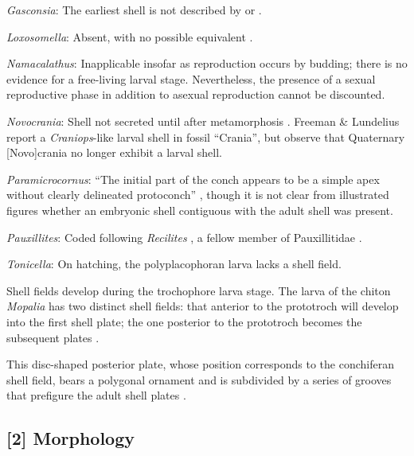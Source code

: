 \documentclass[openany]{book}
\begin{document}
\hypertarget{Gasconsia-coding-1}{}
\emph{Gasconsia}: The earliest shell is not described by
\citet{Hanken1985Thetaxonomy} or \citet{Watkins2002Newrecord}.

\hypertarget{Loxosomella-coding-1}{}
\emph{Loxosomella}: Absent, with no possible equivalent
\citep{Nielsen1966}.

\hypertarget{Namacalathus-coding-1}{}
\emph{Namacalathus}: Inapplicable insofar as reproduction occurs by
budding; there is no evidence for a free-living larval stage.
Nevertheless, the presence of a sexual reproductive phase in addition to
asexual reproduction cannot be discounted.

\hypertarget{Novocrania-coding-1}{}
\emph{Novocrania}: Shell not secreted until after metamorphosis
\citep{Popov2010Earliestontogeny}. Freeman \& Lundelius
\citeyearpar{Freeman1999Changesin} report a \emph{Craniops}-like larval
shell in fossil ``Crania'', but observe that Quaternary {[}Novo{]}crania
no longer exhibit a larval shell.

\hypertarget{Paramicrocornus-coding-1}{}
\emph{Paramicrocornus}: ``The initial part of the conch appears to be a
simple apex without clearly delineated protoconch''
\citep{Zhang2018Ahyolithid}, though it is not clear from illustrated
figures whether an embryonic shell contiguous with the adult shell was
present.

\hypertarget{Pauxillites-coding-1}{}
\emph{Pauxillites}: Coded following \emph{Recilites} \citep{Dzik1978}, a
fellow member of Pauxillitidae \citep{Marek1967}.

\hypertarget{Tonicella-coding-1}{}
\emph{Tonicella}: On hatching, the polyplacophoran larva lacks a shell
field.

Shell fields develop during the trochophore larva stage. The larva of
the chiton \emph{Mopalia} has two distinct shell fields: that anterior
to the prototroch will develop into the first shell plate; the one
posterior to the prototroch becomes the subsequent plates
\citep{Wanninger2002C}.

This disc-shaped posterior plate, whose position corresponds to the
conchiferan shell field, bears a polygonal ornament and is subdivided by
a series of grooves that prefigure the adult shell plates
\citep{Wanninger2002C}.

\subsection*{{[}2{]} Morphology}\label{morphology}
\end{document}
